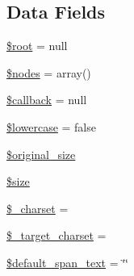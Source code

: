 \subsection*{Data Fields}
\begin{DoxyCompactItemize}
\item 
\hyperlink{classsimple__html__dom_ab37f7c32f41c3c61ed940887453767f4}{\$root} = null
\item 
\hyperlink{classsimple__html__dom_afc84f46342a660cca8589570197bc421}{\$nodes} = array()
\item 
\hyperlink{classsimple__html__dom_abc7c2ac0d93d22f71221e8b60512c860}{\$callback} = null
\item 
\hyperlink{classsimple__html__dom_a8e20508789d34bc35e3b00ad58159d1c}{\$lowercase} = false
\item 
\hyperlink{classsimple__html__dom_ac22338e9abaeaf63325d69086f9ac644}{\$original\+\_\+size}
\item 
\hyperlink{classsimple__html__dom_af594986e4618a8d6a5d7566617f583c6}{\$size}
\item 
\hyperlink{classsimple__html__dom_ad6b00a32790b456a2f1668b2010a262e}{\$\+\_\+charset} = \textquotesingle{}\textquotesingle{}
\item 
\hyperlink{classsimple__html__dom_a8f23f043ea2af2e56d97bebf17347f23}{\$\+\_\+target\+\_\+charset} = \textquotesingle{}\textquotesingle{}
\item 
\hyperlink{classsimple__html__dom_a0da61a0f0e8ff00f0ba83b363d7badda}{\$default\+\_\+span\+\_\+text} = \char`\"{}\char`\"{}
\end{DoxyCompactItemize}
